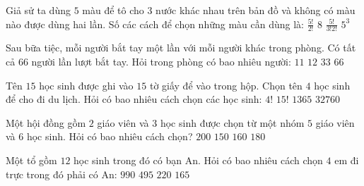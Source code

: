 \begin{ex}
	Giả sử ta dùng $5$ màu để tô cho $3$ nước khác nhau trên bản đồ và không có màu nào được dùng hai lần. Số các cách để chọn những màu cần dùng là:
	\choice
	{\True $\frac{{5!}}{{2!}}$}
	{$8$}
	{$\frac{{5!}}{{3!2!}}$}
	{${5^3}$}
\end{ex}

\begin{ex}
	Sau bữa tiệc, mỗi người bắt tay một lần với mỗi người khác trong phòng. Có tất cả $66$ người lần lượt bắt tay. Hỏi trong phòng có bao nhiêu người:
	\choice
	{$11$}
	{\True $12$}
	{$33$}
	{$66$}
\end{ex}

\begin{ex}
	Tên $15$ học sinh được ghi vào $15$ tờ giấy để vào trong hộp. Chọn tên $4$ học sinh để cho đi du lịch. Hỏi có bao nhiêu cách chọn các học sinh:
	\choice
	{$4!$}
	{$15!$}
	{\True $1365$}
	{$32760$}
\end{ex}

\begin{ex}
	Một hội đồng gồm $2$ giáo viên và $3$ học sinh được chọn từ một nhóm $5$ giáo viên và $6$ học sinh. Hỏi có bao nhiêu cách chọn?
	\choice
	{\True $200$}
	{$150$}
	{$160$}
	{$180$}
\end{ex}

\begin{ex}
	Một tổ gồm $12$ học sinh trong đó có bạn An. Hỏi có bao nhiêu cách chọn $4$ em đi trực trong đó phải có An:
	\choice
	{$990$}
	{$495$}
	{$220$}
	{\True $165$}
\end{ex}


